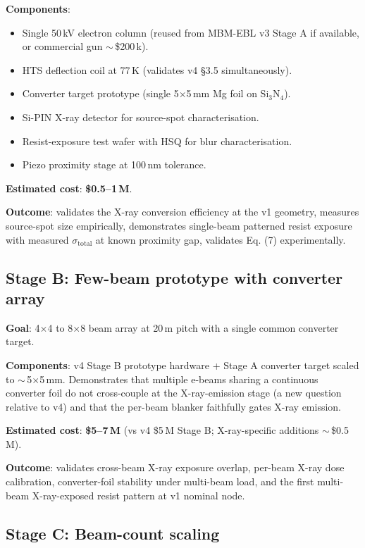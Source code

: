 \documentclass[11pt,letterpaper]{article}
\begin{document}
\textbf{Components}:
\begin{itemize}[leftmargin=1.6em]
  \item Single 50\,kV electron column (reused from MBM-EBL v3 Stage A if available, or commercial gun $\sim$\,\$200\,k).
  \item HTS deflection coil at 77\,K (validates v4 \S 3.5 simultaneously).
  \item Converter target prototype (single 5$\times$5\,mm Mg foil on Si$_3$N$_4$).
  \item Si-PIN X-ray detector for source-spot characterisation.
  \item Resist-exposure test wafer with HSQ for blur characterisation.
  \item Piezo proximity stage at 100\,nm tolerance.
\end{itemize}

\textbf{Estimated cost}: \textbf{\$0.5--1\,M}.

\textbf{Outcome}: validates the X-ray conversion efficiency at the v1 geometry, measures source-spot size empirically, demonstrates single-beam patterned resist exposure with measured $\sigma_\text{total}$ at known proximity gap, validates Eq. (7) experimentally.

\subsection{Stage B: Few-beam prototype with converter array}

\textbf{Goal}: 4$\times$4 to 8$\times$8 beam array at 20\,\textmu m pitch with a single common converter target.

\textbf{Components}: v4 Stage B prototype hardware + Stage A converter target scaled to $\sim$\,5$\times$5\,mm. Demonstrates that multiple e-beams sharing a continuous converter foil do not cross-couple at the X-ray-emission stage (a new question relative to v4) and that the per-beam blanker faithfully gates X-ray emission.

\textbf{Estimated cost}: \textbf{\$5--7\,M} (vs v4 \$5\,M Stage B; X-ray-specific additions $\sim$\,\$0.5\,M).

\textbf{Outcome}: validates cross-beam X-ray exposure overlap, per-beam X-ray dose calibration, converter-foil stability under multi-beam load, and the first multi-beam X-ray-exposed resist pattern at v1 nominal node.

\subsection{Stage C: Beam-count scaling}
\end{document}

